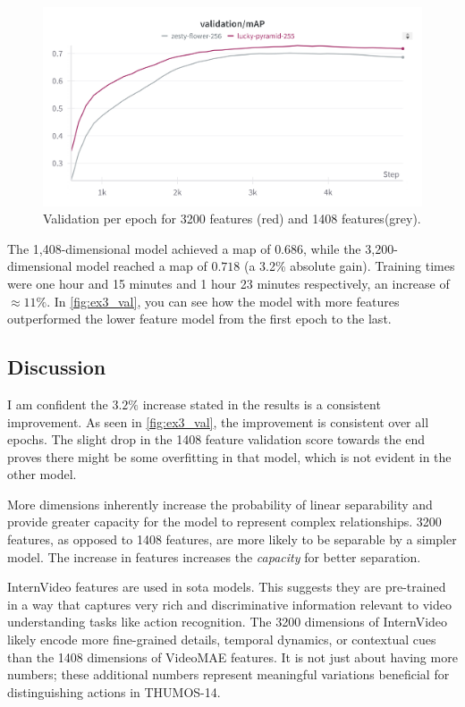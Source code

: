 \begin{figure}
    \centering
    \includegraphics[width=0.75\linewidth]{figures/1408_3200_val.png}
    \caption{Validation per epoch for 3200 features (red) and 1408 features(grey). }
    \label{fig:ex3_val}
\end{figure}
The 1,408-dimensional model achieved a  \acrshort{map} of \(0.686\), while the 3,200-dimensional model reached a \acrshort{map} of \(0.718\) (a 3.2\% absolute gain). Training times were one hour and 15 minutes and 1 hour 23 minutes respectively, an increase of \(\approx11\%\). In \autoref{fig:ex3_val}, you can see how the model with more features outperformed the lower feature model from the first epoch to the last. 


\subsection{Discussion}
\label{ssec:ex3_discussion}


I am confident the $3.2\%$ increase stated in the results is a consistent improvement. As seen in \autoref{fig:ex3_val}, the improvement is consistent over all epochs. The slight drop in the 1408 feature validation score towards the end proves there might be some overfitting in that model, which is not evident in the other model. 


More dimensions inherently increase the probability of linear separability and provide greater capacity for the model to represent complex relationships. 3200 features, as opposed to 1408 features, are more likely to be separable by a simpler model. The increase in features increases the \textit{capacity} for better separation. 


InternVideo features are used in \acrshort{sota} models. This suggests they are pre-trained in a way that captures very rich and discriminative information relevant to video understanding tasks like action recognition. The 3200 dimensions of InternVideo likely encode more fine-grained details, temporal dynamics, or contextual cues than the 1408 dimensions of VideoMAE features. It is not just about having more numbers; these additional numbers represent meaningful variations beneficial for distinguishing actions in THUMOS-14.



